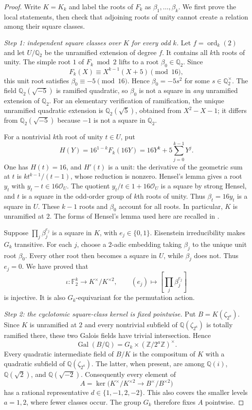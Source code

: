 \documentclass[11pt,a4paper]{article}
\theoremstyle{definition}
\theoremstyle{remark}
\numberwithin{equation}{section}
\begin{document}
\begin{proof}
Write $K=K_k$ and label the roots of $F_k$ as
$\beta_1,\ldots,\beta_k$. We first prove the local statements, then check
that adjoining roots of unity cannot create a relation among their square
classes.

\emph{Step 1: independent square classes over $K$ for every odd $k$.}
Let $f=\operatorname{ord}_k(2)$ and let $U/\mathbb Q_2$ be the unramified
extension of degree $f$. It contains all $k$th roots of unity. The simple
root $1$ of $F_k\bmod2$ lifts to a root $\beta_0\in\mathbb Q_2$.
Since
\[
 F_k(X)\equiv X^{k-1}(X+5)\pmod {16},
\]
this unit root satisfies $\beta_0\equiv-5\pmod {16}$. Hence
$\beta_0=-5s^2$ for some $s\in\mathbb Q_2^\times$.
The field $\mathbb Q_2(\sqrt{-5})$ is ramified quadratic, so $\beta_0$
is not a square in \emph{any} unramified extension of $\mathbb Q_2$.
For an elementary verification of ramification, the unique unramified
quadratic extension is $\mathbb Q_2(\sqrt5)$, obtained from
$X^2-X-1$; it differs from $\mathbb Q_2(\sqrt{-5})$ because $-1$ is
not a square in $\mathbb Q_2$.

For a nontrivial $k$th root of unity $t\in U$, put
\[
 H(Y)=16^{1-k}F_k(16Y)=16Y^k+5\sum_{j=0}^{k-1}Y^j.
\]
One has $H(t)=16$, and $H'(t)$ is a unit: the derivative of the
geometric sum at $t$ is $kt^{k-1}/(t-1)$, whose reduction is nonzero.
Hensel's lemma gives a root $y_t$ with $y_t-t\in16\mathcal O_U$.
The quotient $y_t/t\in1+16\mathcal O_U$ is a square by strong Hensel,
and $t$ is a square in the odd-order group of $k$th roots of unity.
Thus $\beta_t=16y_t$ is a square in $U$. These $k-1$ roots and
$\beta_0$ account for all roots. In particular, $K$ is unramified at $2$.
The forms of Hensel's lemma used here are recalled in \cite{R102}.

Suppose $\prod_j\beta_j^{e_j}$ is a square in $K$, with
$e_j\in\{0,1\}$. Eisenstein irreducibility makes $G_k$ transitive.
For each $j$, choose a $2$-adic embedding taking $\beta_j$ to the
unique unit root $\beta_0$. Every other root then becomes a square in
$U$, while $\beta_j$ does not. Thus $e_j=0$. We have proved that
\[
 \iota:\mathbb F_2^k\longrightarrow K^\times/K^{\times2},\qquad
 (e_j)\longmapsto\left[\prod_j\beta_j^{e_j}\right]
\]
is injective. It is also $G_k$-equivariant for the permutation action.

\emph{Step 2: the cyclotomic square-class kernel is fixed pointwise.}
Put $B=K(\zeta_{2^a})$. Since $K$ is unramified at $2$ and every
nontrivial subfield of $\mathbb Q(\zeta_{2^a})$ is totally ramified
there, these two Galois fields have trivial intersection. Hence
\[
 \operatorname{Gal}(B/\mathbb Q)
   =G_k\times(\mathbb Z/2^a\mathbb Z)^\times.
\]
Every quadratic intermediate field of $B/K$ is the compositum of $K$
with a quadratic subfield of $\mathbb Q(\zeta_{2^a})$. The latter,
when present, are among
$\mathbb Q(i)$, $\mathbb Q(\sqrt2)$, and $\mathbb Q(\sqrt{-2})$.
Consequently every element of
\[
 A=\ker\bigl(K^\times/K^{\times2}\longrightarrow
                  B^\times/B^{\times2}\bigr)
\]
has a rational representative $d\in\{1,-1,2,-2\}$. This also covers
the smaller levels $a=1,2$, where fewer classes occur. The group $G_k$
therefore fixes $A$ pointwise.


\end{proof}
\end{document}
